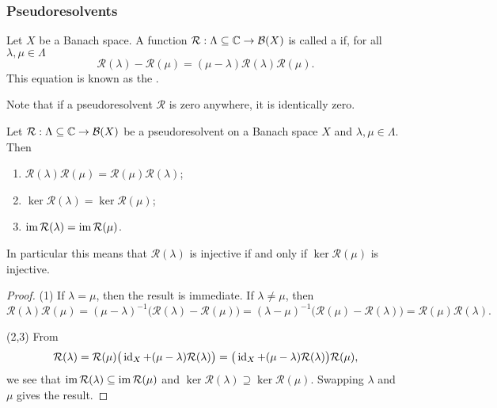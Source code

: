 \subsubsection{Pseudoresolvents}
\begin{definition}
Let $X$ be a Banach space. A function $\mathcal{R}:\Lambda \subseteq \mathbb{C} \to \operatorname{\mathcal{B}}(X)$ is called a  if, for all $\lambda,\mu\in\Lambda$
\[ \mathcal{R}(\lambda) - \mathcal{R}(\mu) = (\mu-\lambda)\mathcal{R}(\lambda)\mathcal{R}(\mu). \]
This equation is known as the .
\end{definition}

Note that if a pseudoresolvent $\mathcal{R}$ is zero anywhere, it is identically zero.

\begin{lemma} \label{commutativityImageRangePseudoresolvents}
Let $\mathcal{R}:\Lambda \subseteq \mathbb{C} \to \operatorname{\mathcal{B}}(X)$ be a pseudoresolvent on a Banach space $X$ and $\lambda,\mu\in\Lambda$. Then
\begin{enumerate}
\item $\mathcal{R}(\lambda)\mathcal{R}(\mu) = \mathcal{R}(\mu)\mathcal{R}(\lambda)$;
\item $\ker\mathcal{R}(\lambda) = \ker\mathcal{R}(\mu)$;
\item $\operatorname{im}\mathcal{R}(\lambda) = \operatorname{im}\mathcal{R}(\mu)$.
\end{enumerate}
In particular this means that $\mathcal{R}(\lambda)$ is injective \textup{if and only if} $\ker\mathcal{R}(\mu)$ is injective.
\end{lemma}
\begin{proof}
(1) If $\lambda = \mu$, then the result is immediate. If $\lambda \neq \mu$, then
\[ \mathcal{R}(\lambda)\mathcal{R}(\mu) = (\mu-\lambda)^{-1}\big(\mathcal{R}(\lambda) - \mathcal{R}(\mu)\big) = (\lambda - \mu)^{-1}\big(\mathcal{R}(\mu) - \mathcal{R}(\lambda)\big) = \mathcal{R}(\mu)\mathcal{R}(\lambda). \]

(2,3) From
\[ \mathcal{R}(\lambda) = \mathcal{R}(\mu)\big(\operatorname{id}_X + (\mu-\lambda)\mathcal{R}(\lambda)\big) = \big(\operatorname{id}_X + (\mu-\lambda)\mathcal{R}(\lambda)\big)\mathcal{R}(\mu), \]
we see that $\operatorname{im}\mathcal{R}(\lambda) \subseteq \operatorname{im}\mathcal{R}(\mu)$ and $\ker\mathcal{R}(\lambda) \supseteq \ker\mathcal{R}(\mu)$. Swapping $\lambda$ and $\mu$ gives the result.
\end{proof}

